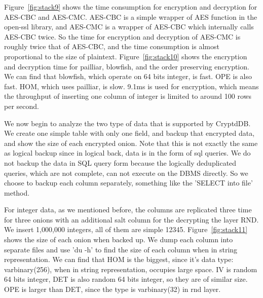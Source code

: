 \begin{figure}
\begin{minipage}[t]{0.5\columnwidth}
  \end{minipage} 
\end{figure}







Figure~\ref{fig:stack9} shows the time consumption for encryption and decryption for AES-CBC and AES-CMC. AES-CBC is a simple wrapper of AES function in the open-ssl library, and AES-CMC is a wrapper of AES-CBC  which internally calls AES-CBC twice. So the time for encryption and decryption of AES-CMC is roughly twice that of AES-CBC, and the time consumption is almost proportional to the size of plaintext. Figure~\ref{fig:stack10} shows the encryption and decryption time for pailliar, blowfish, and the order preserving encryption. We can find that blowfish, which operate on 64 bits integer, is fast. OPE is also fast. HOM, which uses pailliar, is slow. 9.1ms is used for encryption, which means the throughput of inserting one column of integer is limited to around 100 rows per second.

We now begin to analyze the two type of data that is supported by CryptdDB. We create one simple table with only one field, and backup that encrypted data, and show the size of each encrypted onion. Note that this is not exactly the same as logical backup since in logical back, data is in the form of sql queries. We do not backup the data in SQL query form because the logically deduplicated queries, which are not complete, can not execute on the DBMS directly. So we choose to backup each column separately, something like the 'SELECT into file' method.

For integer data, as we mentioned before, the columns are replicated three time for three onions with an additional salt column for the decrypting the layer RND. We insert 1,000,000 integers, all of them are simple 12345. Figure~\ref{fig:stack11} shows the size of each onion when backed up. We dump each column into separate files and use 'du -h' to find the size of each column when in string representation. We can find that HOM is the biggest, since it's data type: varbinary(256), when in string representation, occupies large space. IV is random 64 bits integer, DET is also random 64 bits integer, so they are of similar size. OPE is larger than DET, since the type is varbinary(32) in rnd layer. 


